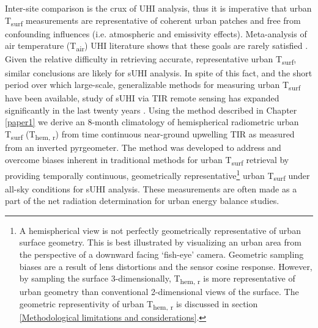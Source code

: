 Inter-site comparison is the crux of UHI analysis, thus it is imperative that urban T\textsubscript{surf} measurements are representative of coherent urban patches and free from confounding influences (i.e. atmospheric and emissivity effects). Meta-analysis of air temperature (T\textsubscript{air}) UHI literature shows that these goals are rarely satisfied \citep{Stewart2011}. Given the relative difficulty in retrieving accurate, representative urban T\textsubscript{surf}, similar conclusions are likely for sUHI analysis. In spite of this fact, and the short period over which large-scale, generalizable methods for measuring urban T\textsubscript{surf} have been available, study of sUHI via TIR remote sensing has expanded significantly in the last twenty years \citep{Peng2012,Voogt2003}. Using the method described in Chapter \ref{paper1} we derive an 8-month climatology of hemispherical radiometric urban T\textsubscript{surf} (T\textsubscript{hem, r}) from time continuous near-ground upwelling TIR as measured from an inverted pyrgeometer. The method was developed to address and overcome biases inherent in traditional methods for urban T\textsubscript{surf} retrieval by providing temporally continuous, geometrically representative\footnote{A hemispherical view is not perfectly geometrically representative of urban surface geometry. This is best illustrated by visualizing an urban area from the perspective of a downward facing ‘fish-eye’ camera. Geometric sampling biases are a result of lens distortions and the sensor cosine response. However, by sampling the surface 3-dimensionally, T\textsubscript{hem, r} is more representative of urban geometry than conventional 2-dimensional views of the surface. The geometric representivity of urban T\textsubscript{hem, r} is discussed in section \ref{Methodological limitations and considerations}.} urban T\textsubscript{surf} under all-sky conditions for sUHI analysis. These measurements are often made as a part of the net radiation determination for urban energy balance studies.

